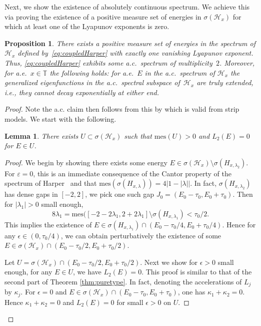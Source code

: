 \documentclass[11pt]{amsart}
\newtheorem{lemma}[theorem]{Lemma}
\newtheorem{proposition}[theorem]{Proposition}
\def\calH{\mathcal{H}}
\def\tor{\mathbb{T}}
\begin{document}
Next, we show the existence of absolutely continuous spectrum.
We achieve this via proving the existence of a positive measure set of energies in $\sigma(\calH_x)$ for which at least one of the Lyapunov exponents is zero.
\begin{proposition}
    \label{prop:ac2Harper'}
    There exists a positive measure set of energies in the spectrum of $\calH_x$ defined by~\eqref{eq:coupledHarper} with exactly one vanishing Lyapunov exponent. Thus, \eqref{eq:coupledHarper} exhibits some a.c.\ spectrum of multiplicity~$2$. Moreover, for a.e.~$x\in\tor$ the following holds: for a.e.~$E$ in the a.c.\ spectrum of $\calH_x$ the generalized eigenfunctions in the a.c.\ spectral subspace of~$\calH_x$ are truly extended, i.e., they cannot decay exponentially at either end. 
\end{proposition}
\begin{proof}
Note the a.c. claim then follows from this by \cite{KS} which is valid from strip models.
We start with the following.
\begin{lemma}\label{lem:U_L=0}
There exists $U\subset \sigma(\calH_x)$ such that $\mathrm{mes}(U)>0$ and $L_2(E)=0$ for $E\in U$.    
\end{lemma}
\begin{proof}
    We begin by showing there exists some energy $E\in \sigma(\calH_x)\setminus \sigma(H_{x,\lambda_2})$.
    For $\varepsilon=0$, this is an immediate consequence of the Cantor property of the spectrum of Harper~\cites{Pu, AJ} and that $\mathrm{mes}(\sigma(H_{x,\lambda}))=4|1-|\lambda||$. In fact, $\sigma(H_{x,\lambda_2})$ has dense gaps in $[-2,2]$, we pick one such gap $J_0=(E_0-\tau_0,E_0+\tau_0)$. Then for $|\lambda_1|>0$ small enough, 
   \[8\lambda_1=\mathrm{mes}([-2-2\lambda_1,2+2\lambda_1]\setminus \sigma(H_{x,\lambda_1})<\tau_0/2.\]
   This implies the existence of $E\in \sigma(H_{x,\lambda_1})\cap (E_0-\tau_0/4,E_0+\tau_0/4)$.
    Hence for any $\epsilon\in (0,\tau_0/4)$, we can obtain perturbatively the existence of some $E\in\sigma(\calH_x)\cap (E_0-\tau_0/2,E_0+\tau_0/2)$.
    
    Let $U=\sigma(\calH_x)\cap (E_0-\tau_0/2, E_0+\tau_0/2)$.
    Next we show for $\epsilon>0$ small enough, for any $E\in U$, we have $L_2(E)=0$. 
    This proof is similar to that of the second part of Theorem \ref{thm:puretype}.
    In fact, denoting the accelerations of $L_j$ by $\kappa_j$. For $\epsilon=0$ and $E\in \sigma(\calH_x)\cap (E_0-\tau_0,E_0+\tau_0)$, one has $\kappa_1+\kappa_2=0$. Hence $\kappa_1+\kappa_2=0$ and $L_2(E)=0$ for small $\epsilon>0$ on $U$. 
    \end{proof}


\end{proof}
\end{document}

